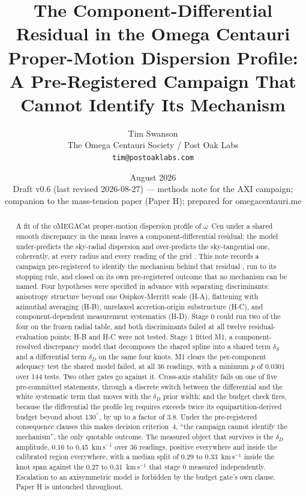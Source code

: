 \documentclass[11pt]{article}
\title{\textbf{The Component-Differential Residual in the Omega Centauri Proper-Motion Dispersion Profile: A Pre-Registered Campaign That Cannot Identify Its Mechanism}}
\author{Tim Swanson\\[2pt]
\small The Omega Centauri Society / Post Oak Labs\\
\small \texttt{tim@postoaklabs.com}}
\date{August 2026 \\[4pt] \small Draft v0.6 (last revised 2026-08-27) --- methods note for the AXI campaign;\\ \small companion to the mass-tension paper (Paper H); prepared for omegacentauri.me}
\newcommand{\ocen}{$\omega$~Cen}
\newcommand{\as}{\ensuremath{^{\prime\prime}}}
\newcommand{\dD}{\ensuremath{\delta_D}}
\newcommand{\dS}{\ensuremath{\delta_S}}
\begin{document}
\maketitle

\begin{abstract}
\noindent
A fit of the oMEGACat proper-motion dispersion profile of \ocen{} under a shared smooth discrepancy in the mean leaves a component-differential residual: the model under-predicts the sky-radial dispersion and over-predicts the sky-tangential one, coherently, at every radius and every reading of the grid \citep{HFit2Report2026}. This note records a campaign pre-registered to identify the mechanism behind that residual \citep{AXIPrereg2026}, run to its stopping rule, and closed on its own pre-registered outcome that no mechanism can be named. Four hypotheses were specified in advance with separating discriminants: anisotropy structure beyond one Osipkov-Merritt scale (H-A), flattening with azimuthal averaging (H-B), unrelaxed accretion-origin substructure (H-C), and component-dependent measurement systematics (H-D). Stage 0 could run two of the four on the frozen radial table, and both discriminants failed at all twelve residual-evaluation points; H-B and H-C were not tested. Stage 1 fitted M1, a component-resolved discrepancy model that decomposes the shared spline into a shared term \dS{} and a differential term \dD{} on the same four knots. M1 clears the per-component adequacy test the shared model failed, at all 36 readings, with a minimum $p$ of 0.0301 over 144 tests. Two other gates go against it. Cross-axis stability fails on one of five pre-committed statements, through a discrete switch between the differential and the white systematic term that moves with the \dD{} prior width; and the budget check fires, because the differential the profile leg requires exceeds twice its equipartition-derived budget beyond about $130\as$, by up to a factor of 3.8. Under the pre-registered consequence clauses this makes decision criterion~4, ``the campaign cannot identify the mechanism'', the only quotable outcome. The measured object that survives is the \dD{} amplitude, 0.16 to 0.45~km\,s$^{-1}$ over 36 readings, positive everywhere and inside the calibrated region everywhere, with a median split of 0.29 to 0.33~km\,s$^{-1}$ inside the knot span against the 0.27 to 0.31~km\,s$^{-1}$ that stage 0 measured independently. Escalation to an axisymmetric model is forbidden by the budget gate's own clause. Paper H is untouched throughout.
\end{abstract}
\end{document}
